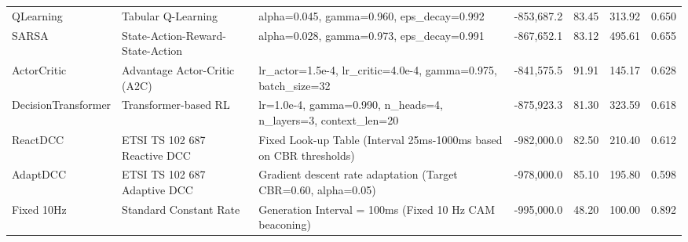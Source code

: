 \begin{table}[t]
{\begin{tabular}{l l p{6.5cm} r r r r}
QLearning & Tabular Q-Learning & \small{alpha=0.045, gamma=0.960, eps\_decay=0.992} & -853,687.2 & 83.45 & 313.92 & 0.650 \\
SARSA & State-Action-Reward-State-Action & \small{alpha=0.028, gamma=0.973, eps\_decay=0.991} & -867,652.1 & 83.12 & 495.61 & 0.655 \\
ActorCritic & Advantage Actor-Critic (A2C) & \small{lr\_actor=1.5e-4, lr\_critic=4.0e-4, gamma=0.975, batch\_size=32} & -841,575.5 & 91.91 & 145.17 & 0.628 \\
DecisionTransformer & Transformer-based RL & \small{lr=1.0e-4, gamma=0.990, n\_heads=4, n\_layers=3, context\_len=20} & -875,923.3 & 81.30 & 323.59 & 0.618 \\
ReactDCC & ETSI TS 102 687 Reactive DCC & \small{Fixed Look-up Table (Interval 25ms-1000ms based on CBR thresholds)} & -982,000.0 & 82.50 & 210.40 & 0.612 \\
AdaptDCC & ETSI TS 102 687 Adaptive DCC & \small{Gradient descent rate adaptation (Target CBR=0.60, alpha=0.05)} & -978,000.0 & 85.10 & 195.80 & 0.598 \\
Fixed 10Hz & Standard Constant Rate & \small{Generation Interval = 100ms (Fixed 10 Hz CAM beaconing)} & -995,000.0 & 48.20 & 100.00 & 0.892 \\
\bottomrule
\end{tabular}
}
\end{table}
